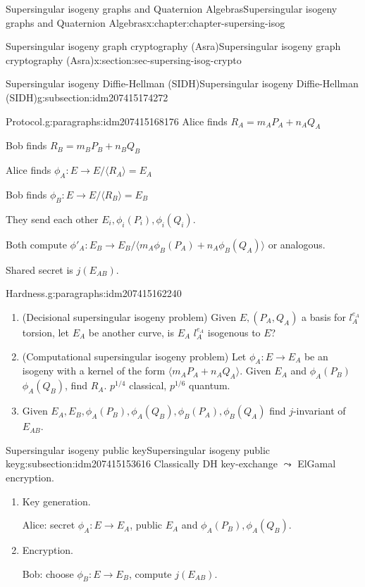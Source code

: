 \documentclass[oneside,10pt,]{book}
\numberwithin{equation}{section}
\begin{document}
\begin{chapterptx}{Supersingular isogeny graphs and Quaternion Algebras}{}{Supersingular isogeny graphs and Quaternion Algebras}{}{}{x:chapter:chapter-supersing-isog}
\begin{sectionptx}{Supersingular isogeny graph cryptography (Asra)}{}{Supersingular isogeny graph cryptography (Asra)}{}{}{x:section:sec-supersing-isog-crypto}
\begin{subsectionptx}{Supersingular isogeny Diffie-Hellman (SIDH)}{}{Supersingular isogeny Diffie-Hellman (SIDH)}{}{}{g:subsection:idm207415174272}
\begin{paragraphs}{Protocol.}{g:paragraphs:idm207415168176}
Alice finds \(R_A = m_AP_A + n_AQ_A\)%
\par
Bob finds \(R_B = m_BP_B + n_BQ_B\)%
\par
Alice finds \(\phi_A \colon E \to E/\langle R_A\rangle = E_A\)%
\par
Bob finds \(\phi_B \colon E \to E/\langle R_B\rangle = E_B\)%
\par
They send each other \(E_i, \phi_i(P_i),\phi_i(Q_i)\).%
\par
Both compute \(\phi'_A\colon E_B \to E_B/\langle m_A\phi_B(P_A) + n_A\phi_B(Q_A)\rangle\) or analogous.%
\par
Shared secret is \(j(E_{AB})\).%
\end{paragraphs}%
\begin{paragraphs}{Hardness.}{g:paragraphs:idm207415162240}%
%
\begin{enumerate}
\item{}(Decisional supersingular isogeny problem) Given \(E, (P_A,Q_A)\) a basis for \(l_A^{e_A}\) torsion, let \(E_A\) be another curve, is \(E_A\) \(l_A^{e_A}\) isogenous to \(E\)?%
\item{}(Computational supersingular isogeny problem) Let \(\phi_A \colon E \to E_A\) be an isogeny with a kernel of the form \(\langle m_AP_A + n_AQ_A \rangle\). Given \(E_A\) and \(\phi_A(P_B)\) \(\phi_A(Q_B)\), find \(R_A\). \(p^{1/4}\) classical, \(p^{1/6}\) quantum.%
\item{}Given \(E_A, E_B, \phi_A(P_B), \phi_A(Q_B), \phi_B(P_A), \phi_B(Q_A)\) find \(j\)-invariant of \(E_{AB}\).%
\end{enumerate}
%
\end{paragraphs}%
\end{subsectionptx}
%
%
\typeout{************************************************}
\typeout{************************************************}
%
\begin{subsectionptx}{Supersingular isogeny public key}{}{Supersingular isogeny public key}{}{}{g:subsection:idm207415153616}
Classically DH key-exchange \(\leadsto\) ElGamal encryption.%
\par
%
\begin{enumerate}
\item{}Key generation.%
\par
Alice: secret \(\phi_A \colon E \to E_A\), public \(E_A\) and \(\phi_A(P_B), \phi_A(Q_B)\).%
\item{}Encryption.%
\par
Bob: choose \(\phi_B \colon E \to E_B\), compute \(j(E_{AB})\).%

\end{enumerate}
\end{subsectionptx}
\end{sectionptx}
\end{chapterptx}
\end{document}
